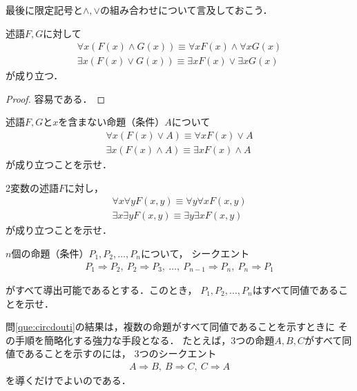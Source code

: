    最後に限定記号と$\land,  \lor$の組み合わせについて言及しておこう．
   \begin{thm} \label{thm:genteilandor}
     述語$F,  G$に対して
     \begin{align}
       \forall x (F(x) \land G(x)) \equiv \forall x F(x) \land \forall x G(x)
       \label{eq:forallland} \\
       \exists x (F(x) \lor G(x)) \equiv \exists xF(x) \lor \exists xG(x)
       \label{eq:existslor}
     \end{align}
     が成り立つ．
   \end{thm}
   \begin{proof}
     容易である．
   \end{proof}
   \begin{que} \label{que:genteilandor}
     述語$F,  G$と$x$を含まない命題（条件）$A$について
     \begin{align}
       \forall x (F(x) \lor A) \equiv \forall x F(x) \lor A
       \label{eq:foralllorA} \\
       \exists x (F(x) \land A) \equiv \exists x F(x) \land A
       \label{eq:existslandA}
     \end{align}
     が成り立つことを示せ．
   \end{que}
   \begin{que} \label{que:genteikoukan}
     2変数の述語$F$に対し，
     \begin{align}
       \forall x \forall y F(x,y) \equiv \forall y \forall x F(x,y)
       \label{eq:forallkoukan} \\
       \exists x \exists y F(x,y) \equiv \exists y \exists x F(x,y)
       \label{eq:existskoukan}
     \end{align}
     が成り立つことを示せ．
   \end{que}
   \begin{que} \label{que:circdouti}
     $n$個の命題（条件）$P_1,  P_2,  \ldots ,  P_n$について，
     シークエント
     \begin{align*}
       P_1 \Longrightarrow P_2 , \  P_2 \Longrightarrow P_3  , \  
       \ldots  ,\   P_{n-1} \Longrightarrow P_n  ,\   P_n \Longrightarrow P_1
     \end{align*}
   \end{que}
   がすべて導出可能であるとする．このとき，
   $P_1,  P_2,  \ldots ,  P_n$はすべて同値であることを示せ．
     
   問\ref{que:circdouti}の結果は，複数の命題がすべて同値であることを示すときに
   その手順を簡略化する強力な手段となる．
   たとえば，3つの命題$A,  B,  C$がすべて同値であることを示すのには，
   3つのシークエント
   \begin{align*}
     A \Longrightarrow B  ,\   B \Longrightarrow C  ,\   C \Longrightarrow A
   \end{align*}
   を導くだけでよいのである．  
